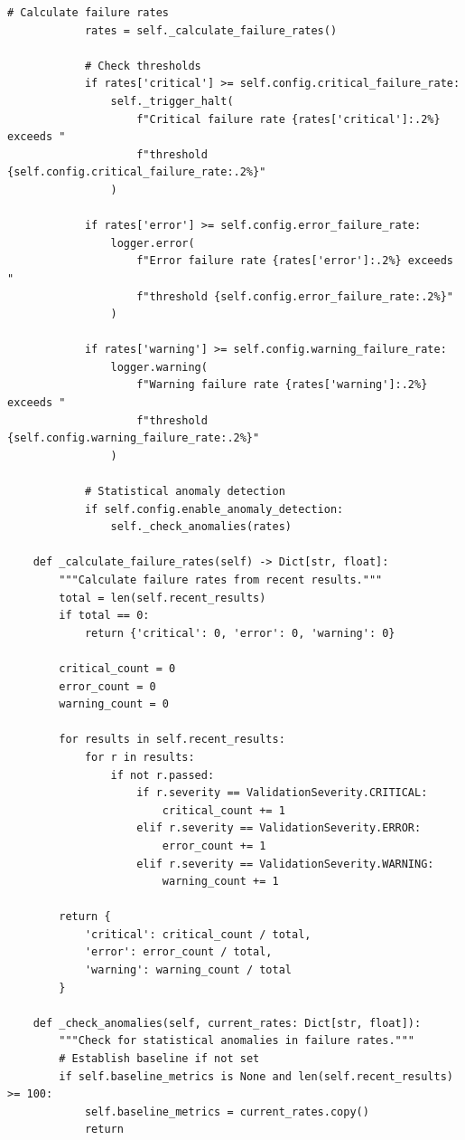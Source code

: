 \begin{lstlisting}[style=python, caption={Data Quality Gate Implementation}]
            # Calculate failure rates
            rates = self._calculate_failure_rates()

            # Check thresholds
            if rates['critical'] >= self.config.critical_failure_rate:
                self._trigger_halt(
                    f"Critical failure rate {rates['critical']:.2%} exceeds "
                    f"threshold {self.config.critical_failure_rate:.2%}"
                )

            if rates['error'] >= self.config.error_failure_rate:
                logger.error(
                    f"Error failure rate {rates['error']:.2%} exceeds "
                    f"threshold {self.config.error_failure_rate:.2%}"
                )

            if rates['warning'] >= self.config.warning_failure_rate:
                logger.warning(
                    f"Warning failure rate {rates['warning']:.2%} exceeds "
                    f"threshold {self.config.warning_failure_rate:.2%}"
                )

            # Statistical anomaly detection
            if self.config.enable_anomaly_detection:
                self._check_anomalies(rates)

    def _calculate_failure_rates(self) -> Dict[str, float]:
        """Calculate failure rates from recent results."""
        total = len(self.recent_results)
        if total == 0:
            return {'critical': 0, 'error': 0, 'warning': 0}

        critical_count = 0
        error_count = 0
        warning_count = 0

        for results in self.recent_results:
            for r in results:
                if not r.passed:
                    if r.severity == ValidationSeverity.CRITICAL:
                        critical_count += 1
                    elif r.severity == ValidationSeverity.ERROR:
                        error_count += 1
                    elif r.severity == ValidationSeverity.WARNING:
                        warning_count += 1

        return {
            'critical': critical_count / total,
            'error': error_count / total,
            'warning': warning_count / total
        }

    def _check_anomalies(self, current_rates: Dict[str, float]):
        """Check for statistical anomalies in failure rates."""
        # Establish baseline if not set
        if self.baseline_metrics is None and len(self.recent_results) >= 100:
            self.baseline_metrics = current_rates.copy()
            return


\end{lstlisting}

